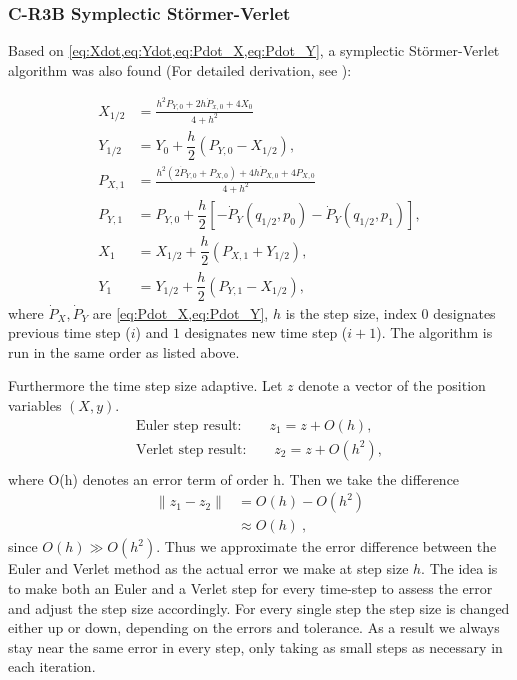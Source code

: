 \subsubsection{C-R3B Symplectic Störmer-Verlet}
Based on \cref{eq:Xdot,eq:Ydot,eq:Pdot_X,eq:Pdot_Y}, a symplectic Störmer-Verlet algorithm was also found (For detailed derivation, see \cite{Saxe2015}):

\begin{align}
    X_{1/2} &= \frac{h^2 P_{Y,0} + 2 h \dot{P}_{x,0} + 4 X_0}{4 + h^2} \label{eq:verlet-x_1/2} \\
    Y_{1/2} &= Y_0 + \dfrac{h}{2} (P_{Y,0} - X_{1/2}), \label{eq:verlet-y_1/2} \\
    P_{X,1} &= \frac{h^2 (2 \dot{P}_{Y,0} + P_{X,0}) + 4 h \dot{P}_{X,0} + 4 P_{X,0} }{4 + h^2} \label{eq:verlet-px_1} \\
    P_{Y,1} &= P_{Y,0} + \dfrac{h}{2} \left[-\dot{P}_Y(q_{1/2},p_0) -\dot{P}_Y(q_{1/2},p_1) \right], \label{eq:verlet-py_1} \\
    X_1 &= X_{1/2} + \dfrac{h}{2} (P_{X,1} + Y_{1/2}), \label{eq:verlet-x_1} \\
    Y_1 &= Y_{1/2} + \dfrac{h}{2} (P_{Y,1} - X_{1/2}), \label{eq:verlet-y_1}
\end{align}
where \(\dot{P}_X,\dot{P}_Y\) are \cref{eq:Pdot_X,eq:Pdot_Y}, \(h\) is the step size, index \(0\) designates previous time step ($i$) and \(1\) designates new time step ($i+1$). The algorithm is run in the same order as listed above.

Furthermore the time step size adaptive. Let $z$ denote a vector of the position variables $(X,y)$.
\begin{align}
\text{Euler step result:} \qquad z_1 = z + O(h), \\
\text{Verlet step result:} \qquad z_2 = z + O(h^2), \\
\end{align}
where O(h) denotes an error term of order h. Then we take the difference
\begin{align}
\|z_1 - z_2\| &= O(h) - O(h^2) \\
&\approx O(h)\ ,
\end{align}
since $O(h) \gg O(h^2)$. Thus we approximate the error difference between the Euler and Verlet method as the actual error we make at step size $h$. The idea is to make both an Euler and a Verlet step for every time-step to assess the error and adjust the step size accordingly. For every single step the step size is changed either up or down, depending on the errors and tolerance. As a result we always stay near the same error in every step, only taking as small steps as necessary in each iteration.

